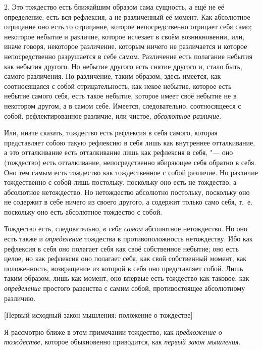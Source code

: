 2. Это тождество есть ближайшим образом сама сущность, а ещё не её
определение, есть вся рефлексия, а не различенный её момент. Как абсолютное
отрицание оно есть то отрицание, которое непосредственно отрицает себя
само; некоторое небытие и различие, которое исчезает в своём возникновении,
или, иначе говоря, некоторое различение, которым ничего не различается и
которое непосредственно разрушается в себе самом. Различение есть полагание
небытия как небытия другого. Но небытие другого есть снятие другого и,
стало быть, самого различения. Но различение, таким образом, здесь имеется,
как соотносящаяся с собой отрицательность, как некое небытие, которое есть
небытие самого себя, есть такое небытие, которое имеет своё небытие не в
некотором другом, а в самом себе. Имеется, следовательно, соотносящееся с
собой, рефлектированное различие, или чистое,
{\em абсолютное различие}.

Или, иначе сказать, тождество есть рефлексия в себя самого, которая
представляет собою такую рефлексию в себя лишь как внутреннее отталкивание,
а это отталкивание есть отталкивание лишь как рефлексия в себя, "--- оно
(тождество) есть отталкивание, непосредственно вбирающее себя обратно в
себя. Оно тем самым есть тождество как тождественное с собой различие. Но
различие тождественно с собой лишь постольку, поскольку оно есть не
тождество, а абсолютное нетождество. Но нетождество абсолютно постольку,
поскольку оно не содержит в себе ничего из своего другого, а содержит
только само себя, т.~е. поскольку оно есть абсолютное тождество с собой.

Тождество есть, следовательно, {\em в себе самом}
абсолютное нетождество. Но оно есть также и
{\em определение} тождества в противоположность
нетождеству. Ибо как рефлексия в себя оно полагает себя как своё
собственное небытие; оно есть целое, но как рефлексия оно полагает себя,
как свой собственный момент, как положенность, возвращение из которой в
себя оно представляет собой. Лишь таким образом, лишь как момент, оно
впервые есть тождество как таковое, как
{\em определение} простого равенства с самим собой,
противостоящее абсолютному различию.

%
  {[Первый исходный закон мышления: положение о тождестве]}

Я рассмотрю ближе в этом примечании тождество, как {\em предложение о
тождестве,} которое обыкновенно приводится, как {\em первый закон мышления}.

